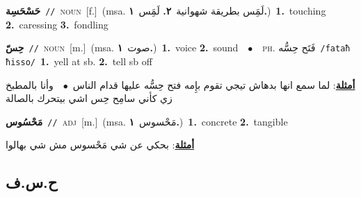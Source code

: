 \documentclass[10pt,a4paper,twoside]{article} %
\begin{document}
\begin{multicols}{2}
{\setlength\topsep{0pt}\textbf{\foreignlanguage{arabic}{حَسْحَسِة}}\ {\color{gray}\texttt{//}\color{black}}\ \textsc{noun}\ [f.]\ \color{gray}(msa. \foreignlanguage{arabic}{لَمَِس بطريقة شهوانية}~\foreignlanguage{arabic}{\textbf{٢.}}  \foreignlanguage{arabic}{لَمَِس}~\foreignlanguage{arabic}{\textbf{١.}})\color{black}\ \textbf{1.}~touching  \textbf{2.}~caressing  \textbf{3.}~fondling\ } \vspace{2mm}

{\setlength\topsep{0pt}\textbf{\foreignlanguage{arabic}{حِسّ}}\ {\color{gray}\texttt{//}\color{black}}\ \textsc{noun}\ [m.]\ \color{gray}(msa. \foreignlanguage{arabic}{صوت}~\foreignlanguage{arabic}{\textbf{١.}})\color{black}\ \textbf{1.}~voice  \textbf{2.}~sound\ \ $\bullet$\ \ \textsc{ph.} \color{gray} \foreignlanguage{arabic}{فَتَح حِسُّه}\color{black}\ {\color{gray}\texttt{/{\sffamily fataħ ħisso}/}\color{black}}\ \textbf{1.}~yell at sb.  \textbf{2.}~tell sb off\  \begin{flushright}\color{gray}\foreignlanguage{arabic}{\textbf{\underline{\foreignlanguage{arabic}{أمثلة}}}: لما سمع انها بدهاش تيجي تقوم بإِمه فتح حِسُّه عليها قدام الناس\ $\bullet$\ \  وأنا بالمطبخ زي كأني سامِح حِس اشي بيتحرك بالصالة}\end{flushright}\color{black}} \vspace{2mm}

{\setlength\topsep{0pt}\textbf{\foreignlanguage{arabic}{مَحْسُوس}}\ {\color{gray}\texttt{//}\color{black}}\ \textsc{adj}\ [m.]\ \color{gray}(msa. \foreignlanguage{arabic}{مَحْسوس}~\foreignlanguage{arabic}{\textbf{١.}})\color{black}\ \textbf{1.}~concrete  \textbf{2.}~tangible\  \begin{flushright}\color{gray}\foreignlanguage{arabic}{\textbf{\underline{\foreignlanguage{arabic}{أمثلة}}}: بحكي عن شي مَحْسوس مش شي بهالوا}\end{flushright}\color{black}} \vspace{2mm}

\vspace{-3mm}
\subsection*{\color{blue}\foreignlanguage{arabic}{ح.س.ف}\color{blue}{}} 


\end{multicols}
\end{document}
